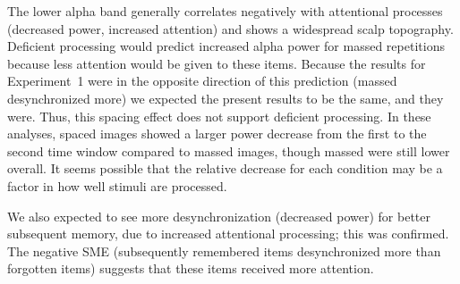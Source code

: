 

The lower alpha band generally correlates negatively with attentional processes (decreased power, increased attention) and shows a widespread scalp topography.  Deficient processing would predict increased alpha power for massed repetitions because less attention would be given to these items.  Because the results for Experiment~1 were in the opposite direction of this prediction (massed desynchronized more) we expected the present results to be the same, and they were.  Thus, this spacing effect does not support deficient processing.  In these analyses, spaced images showed a larger power decrease from the first to the second time window compared to massed images, though massed were still lower overall.  It seems possible that the relative decrease for each condition may be a factor in how well stimuli are processed.

We also expected to see more desynchronization (decreased power) for better subsequent memory, due to increased attentional processing; this was confirmed.
The negative SME (subsequently remembered items desynchronized more than forgotten items) suggests that these items received more attention.



